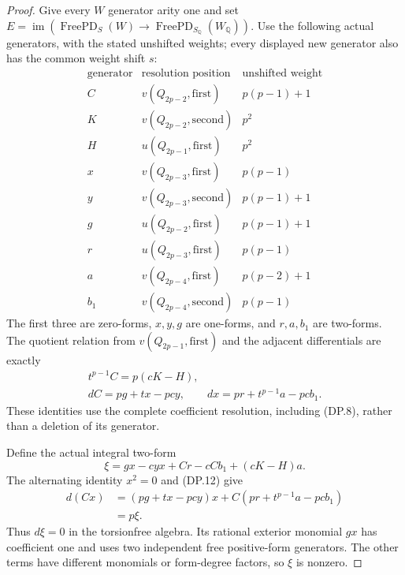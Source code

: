 \begin{proof}
Give every $W$ generator arity one and set
$E=\operatorname{im}(\operatorname{FreePD}_S(W)
 \to\operatorname{FreePD}_{S_{\mathbb Q}}(W_{\mathbb Q}))$.
Use the following actual generators, with the stated
unshifted weights; every displayed new generator also
has the common weight shift $s$:
\[
\begin{array}{c|c|c}
\text{generator}&\text{resolution position}&\text{unshifted weight}\\\hline
 C&v(Q_{2p-2},\text{first})&p(p-1)+1\\
 K&v(Q_{2p-2},\text{second})&p^2\\
 H&u(Q_{2p-1},\text{first})&p^2\\
 x&v(Q_{2p-3},\text{first})&p(p-1)\\
 y&v(Q_{2p-3},\text{second})&p(p-1)+1\\
 g&u(Q_{2p-2},\text{first})&p(p-1)+1\\
 r&u(Q_{2p-3},\text{first})&p(p-1)\\
 a&v(Q_{2p-4},\text{first})&p(p-2)+1\\
 b_1&v(Q_{2p-4},\text{second})&p(p-1)
\end{array}                                                       \tag{DP.11}
\]
The first three are zero-forms, $x,y,g$ are one-forms,
and $r,a,b_1$ are two-forms. The quotient relation from
$v(Q_{2p-1},\text{first})$ and the adjacent differentials
are exactly
\[
 \begin{gathered}
 t^{p-1}C=p(cK-H),\\
 dC=pg+tx-pcy,\qquad dx=pr+t^{p-1}a-pc b_1.
 \end{gathered}                                                    \tag{DP.12}
\]
These identities use the complete coefficient resolution,
including (DP.8), rather than a deletion of its generator.

Define the actual integral two-form
\[
             \xi=gx-cyx+Cr-cCb_1+(cK-H)a.
 \tag{DP.13}
\]
The alternating identity $x^2=0$ and (DP.12) give
\[
 \begin{aligned}
 d(Cx)&=(pg+tx-pcy)x+C(pr+t^{p-1}a-pcb_1)\\
      &=p\xi.
 \end{aligned}                                                    \tag{DP.14}
\]
Thus $d\xi=0$ in the torsionfree algebra.
Its rational exterior monomial $gx$ has coefficient one
and uses two independent free positive-form generators.
The other terms have different monomials or form-degree
factors, so $\xi$ is nonzero.


\end{proof}
